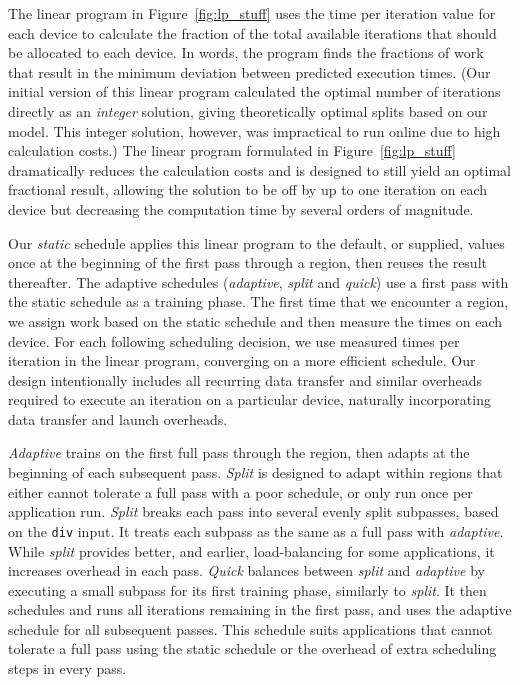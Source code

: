 The linear program in Figure~\ref{fig:lp_stuff} uses the time per
iteration value for each device to calculate the fraction of the total
available iterations that should be allocated to each device. In
words, the program finds the fractions of work that result in the
minimum deviation between predicted execution times.  (Our initial
version of this linear program calculated the optimal number of
iterations directly as an \emph{integer} solution, giving
theoretically optimal splits based on our model.  This integer solution,
however, was impractical to run online
due to high calculation costs.)  The linear program formulated in
Figure~\ref{fig:lp_stuff} dramatically reduces the calculation costs
and is designed to still yield an optimal fractional result, allowing
the solution to be off by up to one iteration on each device but
decreasing the computation time by several orders of magnitude.

Our \emph{static} schedule applies this linear program to the default, or
supplied, values once at the beginning of the first pass through a region,
then reuses the result thereafter.
The adaptive schedules (\emph{adaptive}, \emph{split} and \emph{quick}) use a
first pass with the static schedule as a training phase.  The first time that
we encounter a \tsar region, we assign work based on the static
schedule and then measure the times on each device. For each following
scheduling decision, we use measured times per iteration in the linear
program, converging on a more efficient schedule. Our design
intentionally includes all recurring data transfer and similar overheads
required to execute an iteration on a particular device, naturally
incorporating data transfer and launch overheads.

\emph{Adaptive} trains on the first full pass through the region, then adapts
at the beginning of each subsequent pass. \emph{Split} is designed to adapt
within regions that either cannot tolerate a full pass with a poor schedule,
or only run once per application run. \emph{Split} breaks each pass into
several evenly split subpasses, based on the \verb#div# input. It treats
each subpass as the same as a full pass with \emph{adaptive}. While
\emph{split} provides better, and earlier, load-balancing for some
applications, it increases overhead in each pass. \emph{Quick} balances
between \emph{split} and \emph{adaptive} by executing a small subpass for its
first training phase, similarly to \emph{split}. It then schedules and runs
all iterations remaining in the first pass, and uses the adaptive schedule
for all subsequent passes. This schedule suits applications that cannot
tolerate a full pass using the static schedule or the overhead of extra
scheduling steps in every pass.

